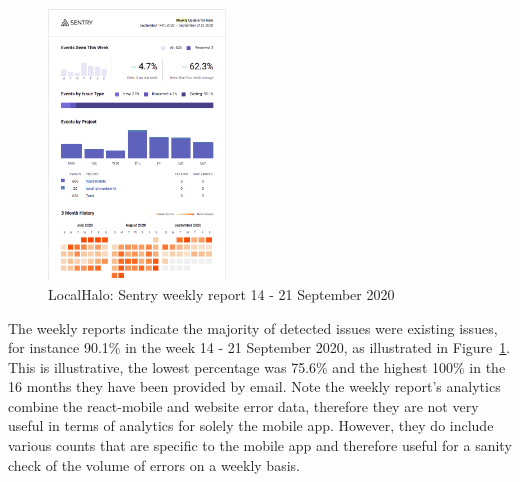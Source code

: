 \begin{figure}
  \begin{center}
    \includegraphics[width=0.42\textwidth]{images/localhalo/sentry-weekly-report-21-Sep-2020.png}
  \end{center}
  \caption{LocalHalo: Sentry weekly report 14 - 21 September 2020}
  \label{fig:localhalo-sentry-weekly-report-21-sep-2020}
\end{figure}

The weekly reports indicate the majority of detected issues were existing issues, for instance 90.1\% in the week 14 - 21 September 2020, as illustrated in Figure~\ref{fig:localhalo-sentry-weekly-report-21-sep-2020}. This is illustrative, the lowest percentage was 75.6\% and the highest 100\% in the 16 months they have been provided by email. Note the weekly report's analytics combine the react-mobile and website error data, therefore they are not very useful in terms of analytics for solely the mobile app. However, they do include various counts that are specific to the mobile app and therefore useful for a sanity check of the volume of errors on a weekly basis.

